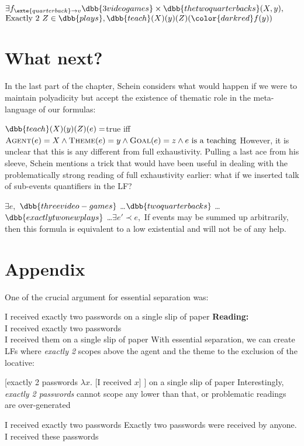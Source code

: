 \documentclass[english]{article}
\begin{document}
\ex
$\exists f_{\exte{quarterback}\rightarrow v}\dbb{3 video games}\times \dbb{the two quarterbacks} (X, y),$\\
$\text{Exactly 2 } Z\in \dbb{plays},  \dbb{teach}(X)(y)(Z)({\color{darkred} f(y)})$
\xe
%

\section{What next?}

In the last part of the chapter, Schein considers what would happen if we were to maintain polyadicity but accept the existence of thematic role in the meta-language of our formulas:

\ex
$\dbb{teach}(X)(y)(Z)(e)=$true iff $\textsc{Agent}(e) = X \wedge \textsc{Theme}(e) = y \wedge \textsc{Goal}(e) = z\wedge e\text{ is a teaching}  $
\xe
%
However, it is unclear that this is any different from full exhaustivity. Pulling a last ace from his sleeve, Schein mentions a trick that would have been useful in dealing with the problematically strong reading of full exhaustivity earlier: what if we inserted talk of sub-events quantifiers in the LF?


\ex
$\exists e,$ $\dbb{three video-games}$ \ldots $\dbb{two quarterbacks}$ \ldots $\dbb{exactly two new plays}$ \ldots $\exists e'\prec e,$ 
\xe
%
If events may be summed up arbitrarily, then this formula is equivalent to a low existential and will not be of any help.

\section*{Appendix}

One of the crucial argument for essential separation was:

\pex
\a I received exactly two passwords on a single slip of paper
\a \textbf{Reading:}\\
I received exactly two passwords\\
I received them on a single slip of paper
\xe
%
With essential separation, we can create LFs where \emph{exactly 2} scopes above the agent and the theme to the exclusion of the locative:

\ex{}
[exactly 2 passwords $\lambda x.$ [I received $x$] ] on a single slip of paper
\xe
%
Interestingly, \emph{exactly 2 passwords} cannot scope any lower than that, or problematic readings are over-generated

\pex
\a 
I received exactly two passwords
\a 
Exactly two passwords were received by anyone.\\
I received these passwords
\xe
%
\end{document}
